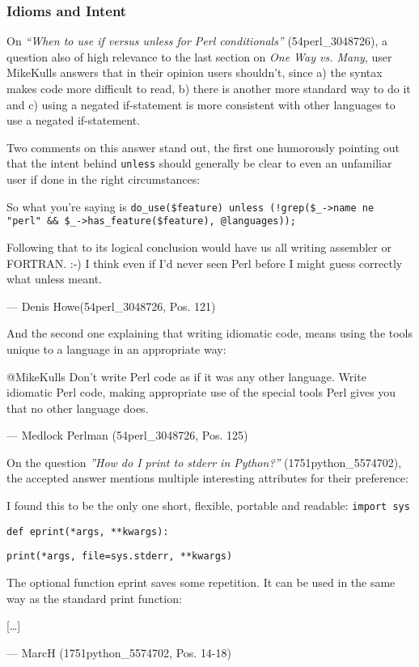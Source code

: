 \subsubsection{Idioms and Intent}

On \textit{“When to use if versus unless for Perl conditionals”} (54perl\_3048726), a question also of high relevance to the
last section on \textit{One Way vs. Many}, user MikeKulls answers that in their opinion users shouldn’t, since a) the syntax makes
code more difficult to read, b) there is another more standard way to do it and c) using a negated if-statement is more
consistent with other languages to use a negated if-statement.

Two comments on this answer stand out, the first one humorously pointing out that the intent behind \texttt{unless} should
generally be clear to even an unfamiliar user if done in the right circumstances:

\begin{displayquote}
    So what you're saying is \texttt{do\_use(\$feature) unless (!grep(\$\_->name ne "perl" \&\& \$\_->has\_feature(\$feature), @languages));}

    Following that to its logical conclusion would have us all writing assembler or FORTRAN. :-) I think even if I'd
    never seen Perl before I might guess correctly what unless meant.

    –-- Denis Howe(54perl\_3048726, Pos. 121)
\end{displayquote}

And the second one explaining that writing idiomatic code, means using the tools unique to a language in an appropriate way:

\begin{displayquote}
    @MikeKulls Don't write Perl code as if it was any other language. Write idiomatic Perl code, making appropriate use
    of the special tools Perl gives you that no other language does.

    --– Medlock Perlman (54perl\_3048726, Pos. 125)
\end{displayquote}

On the question \textit{”How do I print to stderr in Python?”} (1751python\_5574702), the accepted answer mentions multiple
interesting attributes for their preference:

\begin{displayquote}
    I found this to be the only one short, flexible, portable and readable:
    \texttt{import sys}

    \texttt{def eprint(*args, **kwargs):}

    \texttt{print(*args, file=sys.stderr, **kwargs)}

    The optional function eprint saves some repetition. It can be used in the same way as the standard print function:

    [\ldots]

    --- MarcH (1751python\_5574702, Pos. 14-18)
\end{displayquote}

